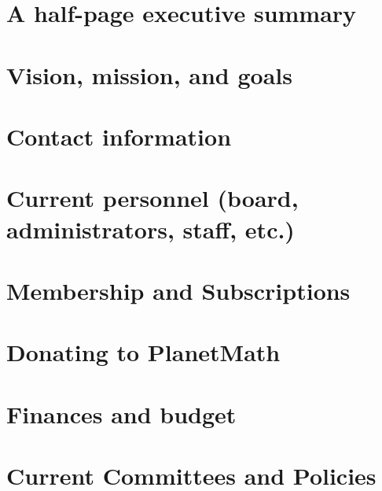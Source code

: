\documentclass[12pt,report]{memoir}
\begin{document}

\section{A half-page executive summary}


\section{Vision, mission, and goals}


\section{Contact information}


\section{Current personnel (board, administrators, staff, etc.)}


\section{Membership and Subscriptions}


\section{Donating to PlanetMath}


\section{Finances and budget}


\section{Current Committees and Policies}

%
\end{document}
